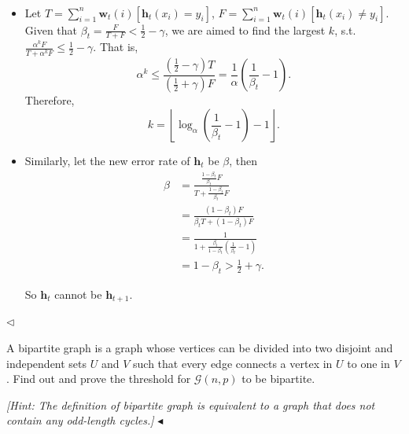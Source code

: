 ﻿\documentclass[11pt]{article}
\newenvironment{problem}[2][Problem]{\begin{trivlist}
\item[\hskip \labelsep {\bfseries #1}\hskip \labelsep {\bfseries #2.}]}{\hfill$\blacktriangleleft$\end{trivlist}}
\newenvironment{answer}[1][Answer]{\begin{trivlist}
\item[\hskip \labelsep {\bfseries #1.}\hskip \labelsep]}{\hfill$\lhd$\end{trivlist}}
\begin{document}
\begin{answer} ~
\begin{itemize}
    \item[(1)] Let $T=\sum_{i=1}^n\bm{w}_t(i)[\bm{h}_t(x_i)=y_i]$, $F=\sum_{i=1}^n\bm{w}_t(i)[\bm{h}_t(x_i)\neq y_i]$. Given that $\beta_t=\frac{F}{T+F}<\frac{1}{2}-\gamma$, we are aimed to find the largest $k$, s.t. $\frac{\alpha^k F}{T+\alpha^k F}\le\frac{1}{2}-\gamma$. That is,
    $$
        \alpha^k\le\frac{\left(\frac{1}{2}-\gamma\right)T}{\left(\frac{1}{2}+\gamma\right) F}=\frac{1}{\alpha}\left(\frac{1}{\beta_t}-1\right).
    $$
    Therefore,
    $$
        k=\left\lfloor\log_{\alpha}\left(\frac{1}{\beta_t}-1\right)-1\right\rfloor.
    $$

    \item[(2)] Similarly, let the new error rate of $\bm{h}_t$ be $\beta$, then
    $$
        \begin{aligned}
            \beta &= \frac{\frac{1-\beta_t}{\beta_t}F}{T+\frac{1-\beta_t}{\beta_t}F}\\
            &= \frac{(1-\beta_t)F}{\beta_t T+(1-\beta_t)F}\\
            &= \frac{1}{1+\frac{\beta_t}{1-\beta_t}\left(\frac{1}{\beta_t}-1\right)}\\
            &= 1-\beta_t>\frac{1}{2}+\gamma.
        \end{aligned}
    $$

    So $\bm{h}_t$ cannot be $\bm{h}_{t+1}$.
\end{itemize}
\end{answer}

\begin{problem}{5 (20')}
A bipartite graph is a graph whose vertices can be divided into two disjoint and independent sets $U$ and $V$ such that every edge connects a vertex in $U$ to one in $V$. Find out and prove the threshold for $\mathcal{G}(n,p)$ to be bipartite.

\textit{[Hint: The definition of bipartite graph is equivalent to a graph that does not contain any odd-length cycles.]}
\end{problem}
\end{document}

